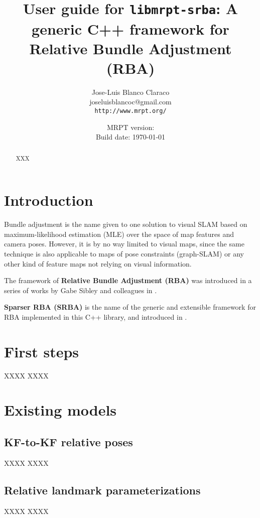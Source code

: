 \documentclass[a4paper,11pt]{article}
\title{User guide for \texttt{libmrpt-srba}: A generic C++ framework for Relative Bundle Adjustment (RBA)}
\author{Jose-Luis Blanco Claraco \\ joseluisblancoc@gmail.com \\ \texttt{http://www.mrpt.org/} }
\date{MRPT version: \MRPTVERSION \\ Build date: \today }
\begin{document}
\maketitle

\begin{abstract}
 XXX
\end{abstract}

\newpage
\tableofcontents
\newpage

\section{Introduction}

Bundle adjustment is the name given to one solution to visual SLAM based on maximum-likelihood estimation (MLE) 
over the space of map features and camera poses. However, it is by no way limited to visual maps, since the same 
technique is also applicable to maps of pose constraints (graph-SLAM) or any other kind of feature maps not relying 
on visual information.

The framework of \textbf{Relative Bundle Adjustment (RBA)} was introduced in a series of works by Gabe Sibley and 
colleagues in \cite{sibley2009rba,sibley2009adaptive}. 

\textbf{Sparser RBA (SRBA)} is the name of the generic and extensible framework for RBA implemented in 
this C++ library, and introduced in \cite{blanco2013srba}.



\section{First steps}

XXXX XXXX 


\section{Existing models}

\subsection{KF-to-KF relative poses}

XXXX XXXX 

\subsection{Relative landmark parameterizations}

XXXX XXXX 
\end{document}
